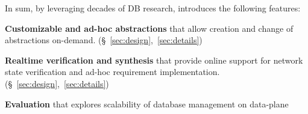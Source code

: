


In sum, by leveraging decades of DB research, \Sys introduces the
following features:

\vspace{-1.5mm}
\begin{compactList}
\item \textbf{Customizable and ad-hoc abstractions} that allow
  creation and change of abstractions
  on-demand. (\S~\ref{sec:design},~\ref{sec:details}) \vspace{-1.5mm}
\item \textbf{Realtime verification and synthesis} 
that provide online support for network state verification and ad-hoc
requirement implementation. (\S~\ref{sec:design},~\ref{sec:details})
\item \textbf{Evaluation} that explores scalability of database
  management on data-plane \vspace{-1.5mm}

\end{compactList}